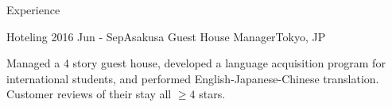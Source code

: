 \documentclass[10pt]{resume} %
\begin{document}
\begin{rSection}{Experience}

  \begin{rSubsection}{Hoteling}
    {2016 Jun - Sep}{Asakusa Guest House Manager}{Tokyo, JP}
      \item Managed a 4 story guest house, developed a language acquisition
      program for international students, and performed English-Japanese-Chinese
      translation. Customer reviews of their stay all $\ge 4$ stars.
  \end{rSubsection}

\end{rSection}

\end{document}
